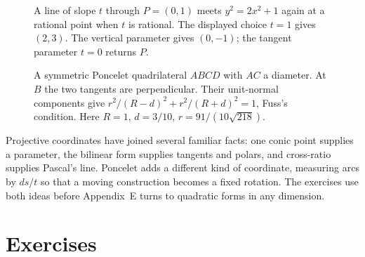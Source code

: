 \FloatBarrier
\begin{figure}[ht]
\centering
{}
\caption{A line of slope $t$ through $P=(0,1)$ meets $y^2=2x^2+1$ again at a rational point when $t$ is rational. The displayed choice $t=1$ gives $(2,3)$. The vertical parameter gives $(0,-1)$; the tangent parameter $t=0$ returns $P$.}
\label{fig:v9-pell-parametrization}
\end{figure}
\begin{figure}[ht]
\centering
{}
\caption{A symmetric Poncelet quadrilateral $ABCD$ with $AC$ a diameter. At $B$ the two tangents are perpendicular. Their unit-normal components give $r^2/(R-d)^2+r^2/(R+d)^2=1$, Fuss's condition. Here $R=1$, $d=3/10$, $r=91/(10\sqrt{218})$.}
\label{fig:v9-fuss-kite}
\end{figure}

Projective coordinates have joined several familiar facts: one conic point supplies a parameter, the bilinear form supplies tangents and polars, and cross-ratio supplies Pascal's line. Poncelet adds a different kind of coordinate, measuring arcs by $ds/t$ so that a moving construction becomes a fixed rotation. The exercises use both ideas before Appendix~E turns to quadratic forms in any dimension.
\FloatBarrier

\section{Exercises}

